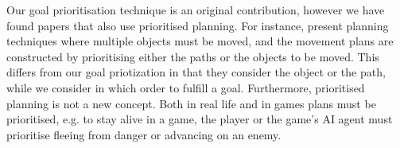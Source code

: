 Our goal prioritisation technique is an original contribution, however we have found papers that also use prioritised planning.
For instance, \cite{van2005prioritized,bennewitz2001optimizing,erdmann1987multiple} present planning techniques where multiple objects must be moved, and the movement plans are constructed by prioritising either the paths or the objects to be moved.
This differs from our goal priotization in that they consider the object or the path, while we consider in which order to fulfill a goal.
Furthermore, prioritised planning is not a new concept.
Both in real life and in games plans must be prioritised, e.g. to stay alive in a game, the player or the game's AI agent must prioritise fleeing from danger or advancing on an enemy.~\cite{orkin2006three}

